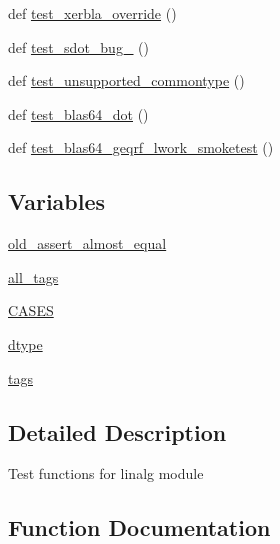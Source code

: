 \begin{DoxyCompactItemize}
\item 
def \hyperlink{namespacenumpy_1_1linalg_1_1tests_1_1test__linalg_aad3fd7489f45cc0e493455a684a89950}{test\+\_\+xerbla\+\_\+override} ()
\item 
def \hyperlink{namespacenumpy_1_1linalg_1_1tests_1_1test__linalg_ae0c2af4971b6e39c7286fea3607b63b1}{test\+\_\+sdot\+\_\+bug\+\_} ()
\item 
def \hyperlink{namespacenumpy_1_1linalg_1_1tests_1_1test__linalg_a6471ae19ef0aa640cf06e7a04034c80a}{test\+\_\+unsupported\+\_\+commontype} ()
\item 
def \hyperlink{namespacenumpy_1_1linalg_1_1tests_1_1test__linalg_a36049018446f836483987172f6e061d9}{test\+\_\+blas64\+\_\+dot} ()
\item 
def \hyperlink{namespacenumpy_1_1linalg_1_1tests_1_1test__linalg_a5c6af9bc5d8a2688fcc8efeba91831f1}{test\+\_\+blas64\+\_\+geqrf\+\_\+lwork\+\_\+smoketest} ()
\end{DoxyCompactItemize}
\subsection*{Variables}
\begin{DoxyCompactItemize}
\item 
\hyperlink{namespacenumpy_1_1linalg_1_1tests_1_1test__linalg_a6e30f88fc45f7fc263eaa1f7e7672714}{old\+\_\+assert\+\_\+almost\+\_\+equal}
\item 
\hyperlink{namespacenumpy_1_1linalg_1_1tests_1_1test__linalg_a8e44384ff1cb6efdbd87c931bb935ca8}{all\+\_\+tags}
\item 
\hyperlink{namespacenumpy_1_1linalg_1_1tests_1_1test__linalg_a9da4f4fbee3763a87ec1993fb2e613e0}{C\+A\+S\+ES}
\item 
\hyperlink{namespacenumpy_1_1linalg_1_1tests_1_1test__linalg_a1063ea74fa35b7244592f8a89b8a71a2}{dtype}
\item 
\hyperlink{namespacenumpy_1_1linalg_1_1tests_1_1test__linalg_ac6a064918e74d701a7b5aac0ffefe1e7}{tags}
\end{DoxyCompactItemize}


\subsection{Detailed Description}
\begin{DoxyVerb}Test functions for linalg module\end{DoxyVerb}
 

\subsection{Function Documentation}
\mbox{\label{namespacenumpy_1_1linalg_1_1tests_1_1test__linalg_a71bf0e4b7271f01106d15d26dadef245}} 
